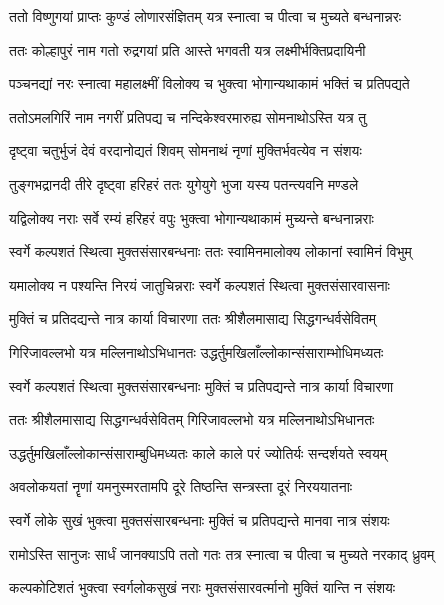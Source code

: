 \twolineshloka
{ततो विष्णुगयां प्राप्तः कुण्डं लोणारसंज्ञितम्}
{यत्र स्नात्वा च पीत्वा च मुच्यते बन्धनान्नरः} %

\twolineshloka
{ततः कोल्हापुरं नाम गतो रुद्रगयां प्रति}
{आस्ते भगवती यत्र लक्ष्मीर्भक्तिप्रदायिनी} %

\twolineshloka
{पञ्चनद्यां नरः स्नात्वा महालक्ष्मीं विलोक्य च}
{भुक्त्वा भोगान्यथाकामं भक्तिं च प्रतिपद्यते} %

\twolineshloka
{ततोऽमलगिरिं नाम नगरीं प्रतिपद्य च}
{नन्दिकेश्वरमारुह्य सोमनाथोऽस्ति यत्र तु} %

\twolineshloka
{दृष्ट्वा चतुर्भुजं देवं वरदानोद्यतं शिवम्}
{सोमनाथं नृणां मुक्तिर्भवत्येव न संशयः} %

\twolineshloka
{तुङ्गभद्रानदी तीरे दृष्ट्वा हरिहरं ततः}
{युगेयुगे भुजा यस्य पतन्त्यवनि मण्डले} %

\twolineshloka
{यद्विलोक्य नराः सर्वे रम्यं हरिहरं वपुः}
{भुक्त्वा भोगान्यथाकामं मुच्यन्ते बन्धनान्नराः} %

\twolineshloka
{स्वर्गे कल्पशतं स्थित्वा मुक्तसंसारबन्धनाः}
{ततः स्वामिनमालोक्य लोकानां स्वामिनं विभुम्} %

\twolineshloka
{यमालोक्य न पश्यन्ति निरयं जातुचिन्नराः}
{स्वर्गे कल्पशतं स्थित्वा मुक्तसंसारवासनाः} %

\twolineshloka
{मुक्तिं च प्रतिदद्यन्ते नात्र कार्या विचारणा}
{ततः श्रीशैलमासाद्य सिद्धगन्धर्वसेवितम्} %

\twolineshloka
{गिरिजावल्लभो यत्र मल्लिनाथोऽभिधानतः}
{उद्धर्तुमखिलाँल्लोकान्संसाराम्भोधिमध्यतः} %

\twolineshloka
{स्वर्गे कल्पशतं स्थित्वा मुक्तसंसारबन्धनाः}
{मुक्तिं च प्रतिपद्यन्ते नात्र कार्या विचारणा} %

\twolineshloka
{ततः श्रीशैलमासाद्य सिद्धगन्धर्वसेवितम्}
{गिरिजावल्लभो यत्र मल्लिनाथोऽभिधानतः} %

\twolineshloka
{उद्धर्तुमखिलाँल्लोकान्संसाराम्बुधिमध्यतः}
{काले काले परं ज्योतिर्यः सन्दर्शयते स्वयम्} %

\twolineshloka
{अवलोकयतां नॄणां यमनुस्मरतामपि}
{दूरे तिष्ठन्ति सन्त्रस्ता दूरं निरययातनाः} %

\twolineshloka
{स्वर्गे लोके सुखं भुक्त्वा मुक्तसंसारबन्धनाः}
{मुक्तिं च प्रतिपद्यन्ते मानवा नात्र संशयः} %

\twolineshloka
{रामोऽस्ति सानुजः सार्धं जानक्याऽपि ततो गतः}
{तत्र स्नात्वा च पीत्वा च मुच्यते नरकाद् ध्रुवम्} %

\twolineshloka
{कल्पकोटिशतं भुक्त्वा स्वर्गलोकसुखं नराः}
{मुक्तसंसारवर्त्मानो मुक्तिं यान्ति न संशयः} %

